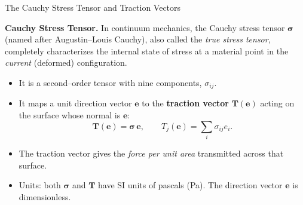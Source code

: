 \documentclass{beamer}
\begin{document}
\begin{frame}{The Cauchy Stress Tensor and Traction Vectors}

\textbf{Cauchy Stress Tensor.}
In continuum mechanics, the Cauchy stress tensor 
$\boldsymbol{\sigma}$ (named after Augustin–Louis Cauchy), also
called the \emph{true stress tensor}, completely characterizes
the internal state of stress at a material point in the
\emph{current} (deformed) configuration.

\medskip

\begin{itemize}
    \item It is a second–order tensor with nine components, $\sigma_{ij}.$

    \item It maps a unit direction vector $\mathbf{e}$ to the
          \textbf{traction vector} $\mathbf{T}(\mathbf{e})$ acting
          on the surface whose normal is $\mathbf{e}$:
    \[
        \mathbf{T}(\mathbf{e}) = \boldsymbol{\sigma}\,\mathbf{e},
        \qquad
        T_j(\mathbf{e}) = \sum_i \sigma_{ij} e_i.
    \]

    \item The traction vector gives the \emph{force per unit area}
          transmitted across that surface.

    \item Units: both $\boldsymbol{\sigma}$ and $\mathbf{T}$ have
          SI units of pascals (Pa). The direction vector 
          $\mathbf{e}$ is dimensionless.
\end{itemize}

\end{frame}
\end{document}
